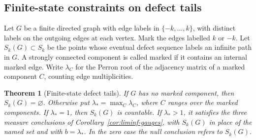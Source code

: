 \documentclass[11pt]{article}
\newtheorem{theorem}{Theorem}
\theoremstyle{definition}
\theoremstyle{remark}
\begin{document}
\subsection{Finite-state constraints on defect tails}\label{sec:finite-state-tail}

Let $G$ be a finite directed graph with edge labels in
$\{-k,\ldots,k\}$, with distinct labels on the outgoing edges at each
vertex. Mark the edges labelled $k$ or $-k$. Let $S_k(G)\subset S_k$ be
the points whose eventual defect sequence labels an infinite path in $G$.
A strongly connected component is called marked if it contains an internal
marked edge. Write $\lambda_C$ for the Perron root of the adjacency matrix
of a marked component $C$, counting edge multiplicities.

\begin{theorem}[Finite-state defect tails]\label{thm:finite-state-tail}
If $G$ has no marked component, then $S_k(G)=\varnothing$.
Otherwise put $\lambda_*=\max_C\lambda_C$, where $C$ ranges over
the marked components. If $\lambda_*=1$, then $S_k(G)$ is countable.
If $\lambda_*>1$, it satisfies the three measure conclusions of
Corollary~\ref{cor:liminf-gauges}, with $S_k(G)$ in place of the named
set and with $b=\lambda_*$. In the zero case the null conclusion refers
to $S_k(G)$.
\end{theorem}
\end{document}
